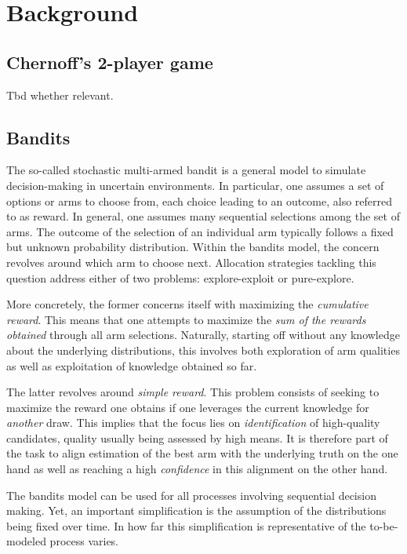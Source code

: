 \chapter{Background}\label{chapter:background}

\section{Chernoff's 2-player game}
Tbd whether relevant.

\section{Bandits}
The so-called stochastic multi-armed bandit is a general model to simulate
decision-making in uncertain environments. In particular, one assumes a set of
options or arms to choose from, each choice leading to an outcome, also referred
to as reward. In general, one assumes many sequential selections among the set
of arms. The outcome of the selection of an individual arm typically follows a
fixed but unknown probability distribution.
Within the bandits model, the concern revolves around which arm to choose next.
Allocation strategies tackling this question address either of two problems:
explore-exploit or pure-explore.

More concretely, the former concerns itself with maximizing the \emph{cumulative
reward}. This means that one attempts to maximize the \emph{sum of the rewards
obtained} through all arm selections. Naturally, starting off without any
knowledge about the underlying distributions, this involves both exploration of
arm qualities as well as exploitation of knowledge obtained so far.

The latter revolves around \emph{simple reward}. This problem consists of
seeking to maximize the reward one obtains if one leverages the current
knowledge for \emph{another} draw. This implies that the focus lies on
\emph{identification} of high-quality candidates, quality usually being assessed
by high means. It is therefore part of the task to align estimation of the
best arm with the underlying truth on the one hand as well as reaching a high
\emph{confidence} in this alignment on the other hand.

The bandits model can be used for all processes involving sequential decision
making. Yet, an important simplification is the assumption of the distributions
being fixed over time. In how far this simplification is representative of the
to-be-modeled process varies.

